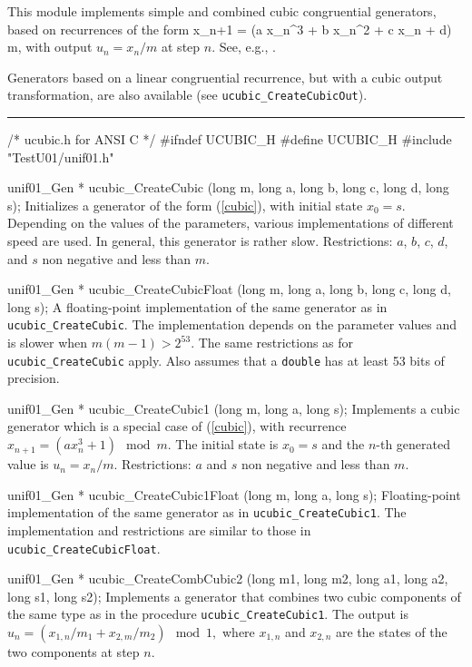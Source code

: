 
This module implements simple and combined cubic congruential 
generators, based on recurrences of the form
\eq
  x_{n+1} = (a x_n^3 + b x_n^2 + c x_n + d) \mod m,   
\endeq
with output $u_n = x_n/m$ at step $n$.
See, e.g., \cite{rEIC97a,rLEC98h}.

Generators based on a linear congruential recurrence, but with
a cubic output transformation, are also available
(see {\tt ucubic\_CreateCubicOut}).


\bigskip
\hrule
\code
\hide
/* ucubic.h for ANSI C */
#ifndef UCUBIC_H
#define UCUBIC_H
\endhide
#include "TestU01/unif01.h"


unif01_Gen * ucubic_CreateCubic (long m, long a, long b, long c, long d,
                                 long s);
\endcode
  \tab  Initializes a generator of the form (\ref{cubic}), with
   initial state $x_0 = s$.
%
   Depending on the values of the parameters, various implementations 
   of different speed are used. 
   In general, this generator is rather slow.  
   Restrictions: $a$, $b$, $c$, $d$, and $s$ non
   negative and less than $m$.
 \endtab
\code


unif01_Gen * ucubic_CreateCubicFloat (long m, long a, long b, long c,
                                      long d, long s);
\endcode
  \tab A floating-point implementation of the same generator as in
   {\tt ucubic\_CreateCubic}.
   The implementation depends on the parameter values and is slower
   when $m(m-1) > 2^{53}$. 
   The same restrictions as for {\tt ucubic\_CreateCubic} apply.
   Also assumes that a {\tt double} has at least 53 bits of precision.
 \endtab
\code


unif01_Gen * ucubic_CreateCubic1 (long m, long a, long s);
\endcode
  \tab  Implements a cubic generator which is a special case of  
   (\ref{cubic}), with recurrence  $x_{n+1} = (a x_n^3 + 1) \mod m$.
   The  initial state is $x_0 = s$ and the $n$-th generated value 
   is $u_n = x_n/m$.
   Restrictions: $a$ and $s$ non negative and less than  $m$.
 \endtab
\code


unif01_Gen * ucubic_CreateCubic1Float (long m, long a, long s);
\endcode
  \tab Floating-point implementation of the same generator as in
  {\tt ucubic\_CreateCubic1}.  The implementation and restrictions are 
  similar to those in {\tt ucubic\_CreateCubicFloat}.
 \endtab
\code


unif01_Gen * ucubic_CreateCombCubic2 (long m1, long m2, long a1, long a2, 
                                      long s1, long s2);
\endcode
  \tab  Implements a generator that combines two cubic components
   of the same type as in the procedure {\tt ucubic\_CreateCubic1}.
  The output is
    $ u_n = (x_{1,n}/m_1 + x_{2,m}/m_2)  \mod 1, $
   where $x_{1,n}$ and $x_{2,n}$ are the states of the two components
   at step $n$.
 \endtab
\code


